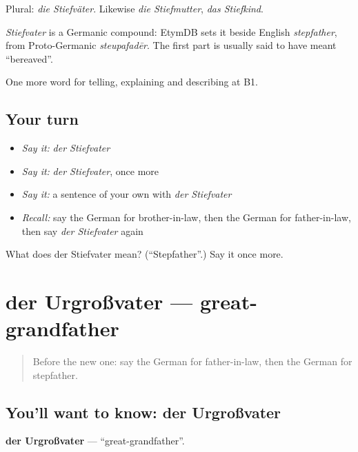Plural: \emph{die Stiefväter}. Likewise \emph{die Stiefmutter}, \emph{das Stiefkind}.

\begin{cousinweb}
\emph{Stiefvater} is a Germanic compound: EtymDB sets it beside English \emph{stepfather}, from Proto-Germanic \emph{steupafadēr}. The first part is usually said to have meant \textquotedblleft{}bereaved\textquotedblright{}.
\end{cousinweb}

\begin{grammarlens}[title={What you've built}]
One more word for telling, explaining and describing at B1.
\end{grammarlens}

\subsection*{Your turn}
\begin{itemize}
\raggedright
  \item \emph{Say it:} \emph{der Stiefvater}
  \item \emph{Say it:} \emph{der Stiefvater}, once more
  \item \emph{Say it:} a sentence of your own with \emph{der Stiefvater}
  \item \emph{Recall:} say the German for brother-in-law, then the German for father-in-law, then say \emph{der Stiefvater} again
\end{itemize}

\begin{tcolorbox}[breakable,colback=teal!4,colframe=teal!35!black,title={Before you move on}]
What does der Stiefvater mean? (\textquotedblleft{}Stepfather\textquotedblright{}.) Say it once more.
\end{tcolorbox}
\section[der Urgroßvater]{der Urgroßvater — great-grandfather}

\label{lesson:GE-C490-urgrossvater}



\begin{quote}
Before the new one: say the German for father-in-law, then the German for stepfather.
\end{quote}

\subsection*{You'll want to know: der Urgroßvater}
\textbf{der Urgroßvater} — \textquotedblleft{}great-grandfather\textquotedblright{}.

